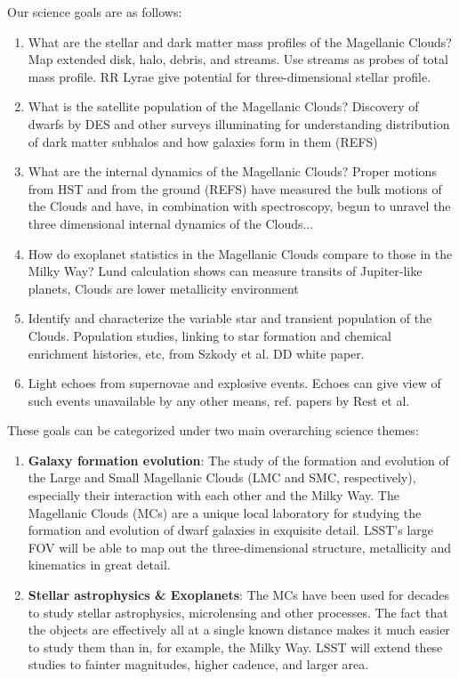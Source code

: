 Our science goals are as follows:
\begin{enumerate}
\item What are the stellar and dark matter mass profiles of the
Magellanic Clouds?  Map extended disk, halo, debris, and streams.  Use
streams as probes of total mass profile.  RR Lyrae give potential for
three-dimensional stellar profile.
\item What is the satellite population of the Magellanic Clouds?
Discovery of dwarfs by DES and other surveys illuminating for
understanding distribution of dark matter subhalos and how galaxies
form in them (REFS)
\item What are the internal dynamics of the Magellanic Clouds?  Proper
motions from HST and from the ground (REFS) have measured the bulk
motions of the Clouds and have, in combination with spectroscopy,
begun to unravel the three dimensional internal dynamics of the
Clouds...
\item How do exoplanet statistics in the Magellanic Clouds compare to
those in the Milky Way?  Lund calculation shows can measure transits
of Jupiter-like planets, Clouds are lower metallicity environment
\item Identify and characterize the variable star and transient
population of the Clouds.  Population studies, linking to star
formation and chemical enrichment histories, etc, from Szkody et al.
DD white paper.
\item Light echoes from supernovae and explosive events.  Echoes can
give view of such events unavailable by any other means, ref. papers
by Rest et al.
\end{enumerate}

These goals can be categorized under two main overarching science themes:
\begin{enumerate}
\item {\bf Galaxy formation evolution}: The study of the formation and
evolution of the Large and Small Magellanic Clouds (LMC and SMC,
respectively), especially their interaction with each other and the
Milky Way. The Magellanic Clouds (MCs) are a unique local laboratory
for studying the formation and evolution of dwarf galaxies in
exquisite detail.  LSST's large FOV will be able to map out the
three-dimensional structure, metallicity and kinematics in great
detail.
\item {\bf Stellar astrophysics \& Exoplanets}:  The MCs have been
used for decades to study stellar astrophysics, microlensing and other
processes.  The fact that the objects are effectively all at a single
known distance makes it much easier to study them than in, for
example, the Milky Way.  LSST will extend these studies to fainter
magnitudes, higher cadence, and larger area.
\end{enumerate}

